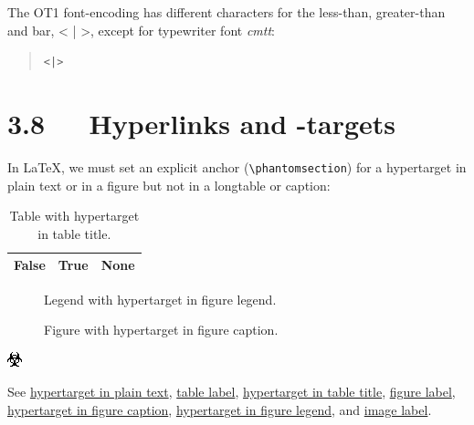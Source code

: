 \documentclass[a4paper]{memoir}
\newlength{\DUtablewidth} %
\newenvironment{DUlegend}{\small}{}
\providecommand*{\DUroletitlereference}[1]{\textsl{#1}}
\begin{document}
The OT1 font-encoding has different characters for the less-than,
greater-than and bar, < | >, except for typewriter font \DUroletitlereference{cmtt}:

\begin{quote}
\begin{alltt}
< | >
\end{alltt}
\end{quote}


\section{3.8   Hyperlinks and -targets%
  \label{hyperlinks-and-targets}%
}

In LaTeX, we must set an explicit anchor (\texttt{\textbackslash{}phantomsection}) for a
%
\label{hypertarget-in-plain-text}hypertarget in plain text or in a figure but not in a longtable or
caption:

\setlength{\DUtablewidth}{\linewidth}%
\begin{longtable}{|p{0.075\DUtablewidth}|p{0.075\DUtablewidth}|p{0.075\DUtablewidth}|}
\caption{Table with %
\label{hypertarget-in-table-title}hypertarget in table title.}\\
\hline

False
 & 
True
 & 
None
 \\
\hline
\end{longtable}
\label{table-label}

\begin{figure}
\label{figure-label}
\noindent{}
\caption{Figure with %
\label{hypertarget-in-figure-caption}hypertarget in figure caption.}
\begin{DUlegend}
Legend with %
\label{hypertarget-in-figure-legend}hypertarget in figure legend.
\end{DUlegend}
\end{figure}

\includegraphics{../../../docs/user/rst/images/biohazard.png}
\label{image-label}

See \hyperref[hypertarget-in-plain-text]{hypertarget in plain text},
\hyperref[table-label]{table label}, \hyperref[hypertarget-in-table-title]{hypertarget in table title},
\hyperref[figure-label]{figure label}, \hyperref[hypertarget-in-figure-caption]{hypertarget in figure caption},
\hyperref[hypertarget-in-figure-legend]{hypertarget in figure legend}, and
\hyperref[image-label]{image label}.
\end{document}
